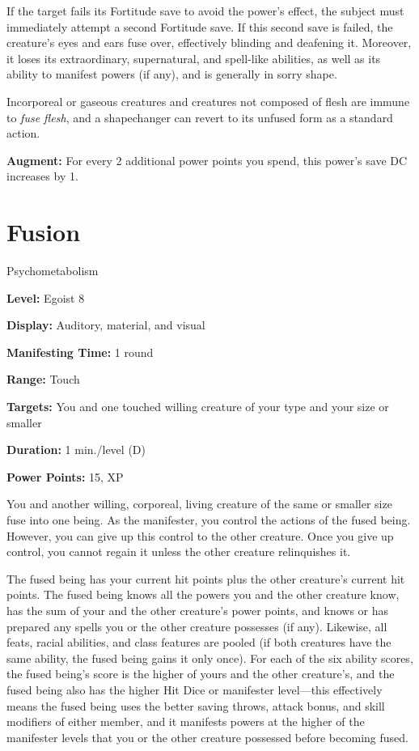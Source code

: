\documentclass{article}
\begin{document}
If the target fails its Fortitude save to avoid the power's effect, the subject 
must immediately attempt a second Fortitude save. If this second save is failed, 
the creature's eyes and ears fuse over, effectively blinding and deafening it. 
Moreover, it loses its extraordinary, supernatural, and spell-like abilities, as 
well as its ability to manifest powers (if any), and is generally in sorry shape.

Incorporeal or gaseous creatures and creatures not composed of flesh are immune 
to \textit{fuse flesh}, and a shapechanger can revert to its unfused form as a 
standard action.

\textbf{Augment:} For every 2 additional power points you spend, this power's save 
DC increases by 1.

\vspace{12pt}
\section*{Fusion}

Psychometabolism

\textbf{Level:} Egoist 8

\textbf{Display:} Auditory, material, and visual

\textbf{Manifesting Time:} 1 round

\textbf{Range:} Touch

\textbf{Targets:} You and one touched willing creature of your type and your size 
or smaller

\textbf{Duration:} 1 min./level (D)

\textbf{Power Points:} 15, XP

You and another willing, corporeal, living creature of the same or smaller size 
fuse into one being. As the manifester, you control the actions of the fused being. 
However, you can give up this control to the other creature. Once you give up control, 
you cannot regain it unless the other creature relinquishes it.

The fused being has your current hit points plus the other creature's current hit 
points. The fused being knows all the powers you and the other creature know, has 
the sum of your and the other creature's power points, and knows or has prepared 
any spells you or the other creature possesses (if any). Likewise, all feats, racial 
abilities, and class features are pooled (if both creatures have the same ability, 
the fused being gains it only once). For each of the six ability scores, the fused 
being's score is the higher of yours and the other creature's, and the fused being 
also has the higher Hit Dice or manifester level---this effectively means the fused 
being uses the better saving throws, attack bonus, and skill modifiers of either 
member, and it manifests powers at the higher of the manifester levels that you 
or the other creature possessed before becoming fused.
\end{document}
